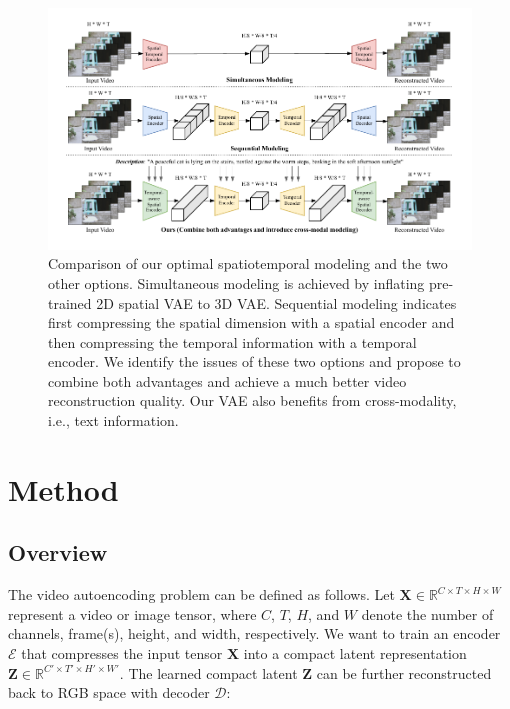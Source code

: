 \begin{figure}[t]
\centering
\includegraphics[width=1.0\textwidth]{images/vae_overall3.pdf}
\caption{Comparison of our optimal spatiotemporal modeling and the two other options. Simultaneous modeling is achieved by inflating pre-trained 2D spatial VAE to 3D VAE. Sequential modeling indicates first compressing the spatial dimension with a spatial encoder and then compressing the temporal information with a temporal encoder. 
We identify the issues of these two options and propose to combine both advantages and achieve a much better video reconstruction quality. 
Our VAE also benefits from cross-modality, i.e., text information. 
}
\label{fig:framework}
\vspace{-3mm}
\end{figure}






\section{Method}


\subsection{Overview}
The video autoencoding problem can be defined as follows. Let $\mathbf{X} \in \mathbb{R}^{C \times T \times H \times W}$ represent a video or image tensor, where $C$, $T$, $H$, and $W$ denote the number of channels, frame(s), height, and width, respectively. We want to train an encoder $\mathcal{E}$ that compresses the input tensor $\mathbf{X}$ into a compact latent representation $\mathbf{Z} \in \mathbb{R}^{C' \times T' \times H' \times W'}$.
%
The learned compact latent $\mathbf{Z}$ can be further reconstructed back to RGB space with decoder $\mathcal{D}$:

